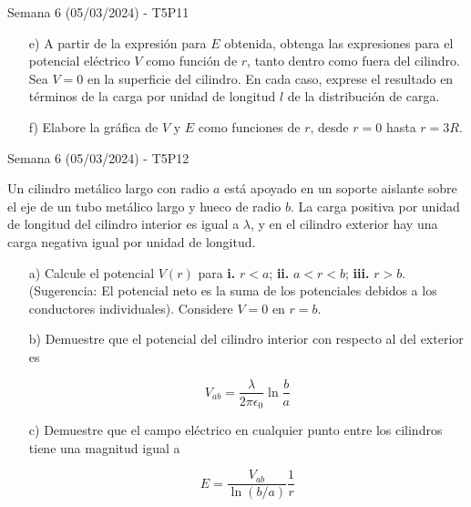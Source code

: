 \begin{frame}{Semana 6 (05/03/2024) - T5P11}
    \begin{itemize}
    
        \item[e)] A partir de la expresión para $E$ obtenida, obtenga las expresiones para el potencial eléctrico $V$ como
función de $r$, tanto dentro como fuera del cilindro. Sea $V = 0$ en la superficie del cilindro. En cada caso, exprese el resultado en términos de la
carga por unidad de longitud $l$ de la distribución de carga.
\item[f)] Elabore 
la gráfica de $V$ y $E$ como funciones de $r$, desde $r = 0$ hasta $r = 3R$.
    \end{itemize}
\end{frame}

\begin{frame}{Semana 6 (05/03/2024) - T5P12}

\small

Un cilindro metálico largo con
radio $a$ está apoyado en un soporte aislante sobre el eje de un tubo
metálico largo y hueco de radio $b$. La carga positiva por unidad de longitud del cilindro interior es igual a $\lambda$, y en el cilindro exterior hay una
carga negativa igual por unidad de longitud.
\begin{itemize}
    \item[a)] Calcule el potencial
$V(r)$ para \textbf{i.} $r < a$; \textbf{ii.} $a< r < b$; \textbf{iii.} $r > b$. (Sugerencia: El potencial neto
es la suma de los potenciales debidos a los conductores individuales).
Considere $V = 0$ en $r = b$.

\item[b)] Demuestre que el potencial del cilindro
interior con respecto al del exterior es

$$ V_{ab} = \frac{\lambda}{2\pi\epsilon_0} \ln\frac{b}{a}$$

\item[c)] Demuestre
que el campo eléctrico en cualquier punto entre los cilindros tiene una
magnitud igual a

$$ E = \frac{V_{ab}}{\ln(b/a)}\frac{1}{r} $$


\end{itemize}


\end{frame}

